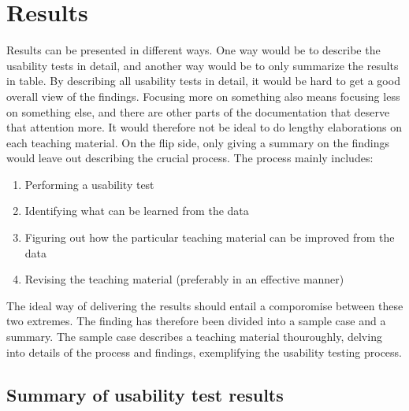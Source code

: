 \chapter{Results}
Results can be presented in different ways. One way would be to describe the usability tests in detail, and another way would be to only summarize the results in table. 
By describing all usability tests in detail, it would be hard to get a good overall view of the findings. Focusing more on something also means focusing less on something 
else, and there are other parts of the documentation that deserve that attention more. It would therefore not be ideal to do lengthy elaborations on each teaching material.
On the flip side, only giving a summary on the findings would leave out describing the crucial process. The process mainly includes:
\begin{enumerate}
	\item Performing a usability test
	\item Identifying what can be learned from the data
	\item Figuring out how the particular teaching material can be improved from the data
	\item Revising the teaching material (preferably in an effective manner)
\end{enumerate}
The ideal way of delivering the results should entail a comporomise between these two extremes. The finding has therefore been divided into a sample case and a summary.
The sample case describes a teaching material thouroughly, delving into details of the process and findings, exemplifying the usability testing process. 


%

\section{Summary of usability test results}


